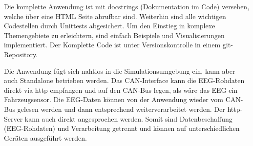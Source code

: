 Die komplette Anwendung ist mit docstrings (Dokumentation im Code) versehen, welche über eine HTML Seite abrufbar sind. Weiterhin sind alle wichtigen Codestellen durch Unittests abgesichert. Um den Einstieg in komplexe Themengebiete zu erleichtern, sind einfach Beispiele und Visualisierungen implementiert. Der Komplette Code ist unter Versionskontrolle in einem git-Repository.

Die Anwendung fügt sich nahtlos in die Simulationsumgebung ein, kann aber auch Standalone betrieben werden. Das CAN-Interface kann die EEG-Rohdaten direkt via http empfangen und auf den CAN-Bus legen, als wäre das EEG ein Fahrzeugsensor. Die EEG-Daten können von der Anwendung wieder vom CAN-Bus gelesen werden und dann entsprechend weiterverarbeitet werden. Der http-Server kann auch direkt angesprochen werden. Somit sind Datenbeschaffung (EEG-Rohdaten) und Verarbeitung getrennt und können auf unterschiedlichen Geräten ausgeführt werden.